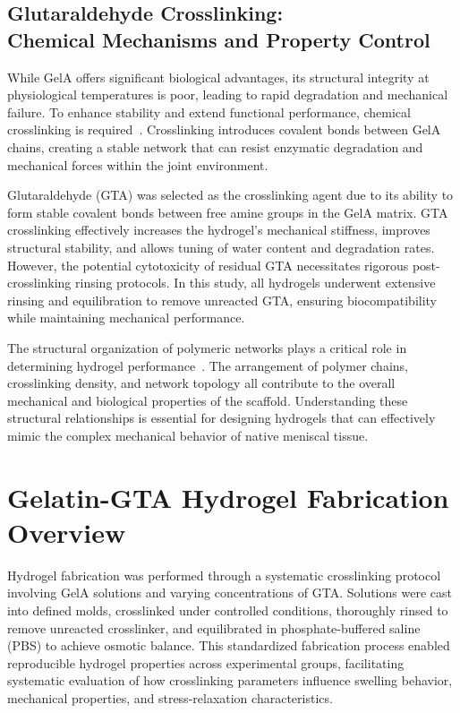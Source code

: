 \subsection{Glutaraldehyde Crosslinking: \protect\\ Chemical Mechanisms and Property Control}

While GelA offers significant biological advantages, its structural integrity at physiological temperatures is poor, leading to rapid degradation and mechanical failure. To enhance stability and extend functional performance, chemical crosslinking is required~\cite{ahmed2015hydrogelpreparation,gao2018electrospunfiber,chaudhuri2016hydrogelstunable}. Crosslinking introduces covalent bonds between GelA chains, creating a stable network that can resist enzymatic degradation and mechanical forces within the joint environment.

Glutaraldehyde (GTA) was selected as the crosslinking agent due to its ability to form stable covalent bonds between free amine groups in the GelA matrix. GTA crosslinking effectively increases the hydrogel's mechanical stiffness, improves structural stability, and allows tuning of water content and degradation rates. However, the potential cytotoxicity of residual GTA necessitates rigorous post-crosslinking rinsing protocols. In this study, all hydrogels underwent extensive rinsing and equilibration to remove unreacted GTA, ensuring biocompatibility while maintaining mechanical performance.

The structural organization of polymeric networks plays a critical role in determining hydrogel performance~\cite{brand2001structuraloutline}. The arrangement of polymer chains, crosslinking density, and network topology all contribute to the overall mechanical and biological properties of the scaffold. Understanding these structural relationships is essential for designing hydrogels that can effectively mimic the complex mechanical behavior of native meniscal tissue.

\section{Gelatin-GTA Hydrogel Fabrication Overview} \label{sec:ch2_methods}

Hydrogel fabrication was performed through a systematic crosslinking protocol involving GelA solutions and varying concentrations of GTA. Solutions were cast into defined molds, crosslinked under controlled conditions, thoroughly rinsed to remove unreacted crosslinker, and equilibrated in phosphate-buffered saline (PBS) to achieve osmotic balance. This standardized fabrication process enabled reproducible hydrogel properties across experimental groups, facilitating systematic evaluation of how crosslinking parameters influence swelling behavior, mechanical properties, and stress-relaxation characteristics.

